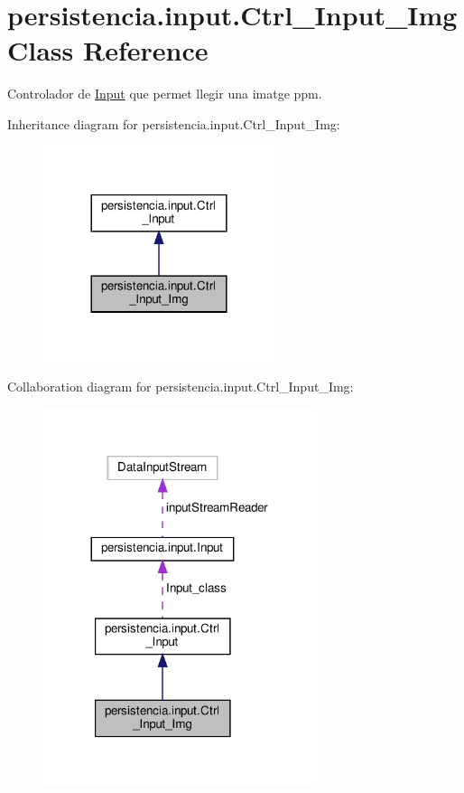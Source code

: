 \hypertarget{classpersistencia_1_1input_1_1Ctrl__Input__Img}{}\section{persistencia.\+input.\+Ctrl\+\_\+\+Input\+\_\+\+Img Class Reference}
\label{classpersistencia_1_1input_1_1Ctrl__Input__Img}


Controlador de \hyperlink{classpersistencia_1_1input_1_1Input}{Input} que permet llegir una imatge ppm.  




Inheritance diagram for persistencia.\+input.\+Ctrl\+\_\+\+Input\+\_\+\+Img\+:\nopagebreak
\begin{figure}[H]
\begin{center}
\leavevmode
\includegraphics[width=192pt]{classpersistencia_1_1input_1_1Ctrl__Input__Img__inherit__graph}
\end{center}
\end{figure}


Collaboration diagram for persistencia.\+input.\+Ctrl\+\_\+\+Input\+\_\+\+Img\+:\nopagebreak
\begin{figure}[H]
\begin{center}
\leavevmode
\includegraphics[width=227pt]{classpersistencia_1_1input_1_1Ctrl__Input__Img__coll__graph}
\end{center}
\end{figure}
